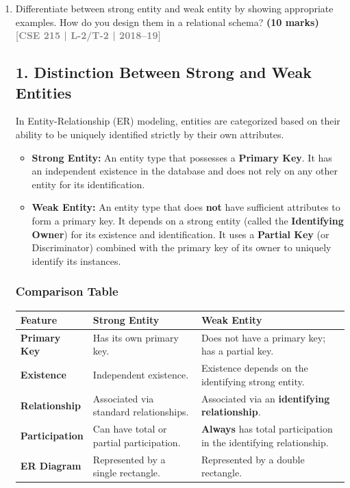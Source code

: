 \documentclass[12pt,a3paper]{article}
\newcommand{\yr}[1]{\hfill\textcolor{gray}{\small\textbf{[#1]}}}
\newcommand{\mk}[1]{\textcolor{orange!70!black}{\small\textbf{(#1 marks)}}}
\begin{document}
\begin{enumerate}


\item Differentiate between strong entity and weak entity by showing appropriate examples. How do you design them in a relational schema?
\mk{10} \yr{CSE 215 | L-2/T-2 | 2018--19}

\begin{tcolorbox}[enhanced,breakable,ansbox,colback=cA!4,colframe=cA,boxrule=0.8pt,arc=5pt,title={\textbf{Answer}},fonttitle=\bfseries\color{white},colbacktitle=cA]

\subsection*{1. Distinction Between Strong and Weak Entities}

In Entity-Relationship (ER) modeling, entities are categorized based on their ability to be uniquely identified strictly by their own attributes.

\begin{itemize}
    \item \textbf{Strong Entity:} An entity type that possesses a \textbf{Primary Key}. It has an independent existence in the database and does not rely on any other entity for its identification.
    \item \textbf{Weak Entity:} An entity type that does \textbf{not} have sufficient attributes to form a primary key. It depends on a strong entity (called the \textbf{Identifying Owner}) for its existence and identification. It uses a \textbf{Partial Key} (or Discriminator) combined with the primary key of its owner to uniquely identify its instances.
\end{itemize}

\subsubsection*{Comparison Table}
\begin{center}
\renewcommand{\arraystretch}{1.4}
\begin{tabularx}{\textwidth}{@{} >{\bfseries}l X X @{}}
\toprule
Feature & Strong Entity & Weak Entity \\
\midrule
\textbf{Primary Key} & Has its own primary key. & Does not have a primary key; has a partial key. \\
\textbf{Existence} & Independent existence. & Existence depends on the identifying strong entity. \\
\textbf{Relationship} & Associated via standard relationships. & Associated via an \textbf{identifying relationship}. \\
\textbf{Participation} & Can have total or partial participation. & \textbf{Always} has total participation in the identifying relationship. \\
\textbf{ER Diagram} & Represented by a single rectangle. & Represented by a double rectangle. \\
\bottomrule
\end{tabularx}
\end{center}


\end{tcolorbox}
\end{enumerate}
\end{document}
